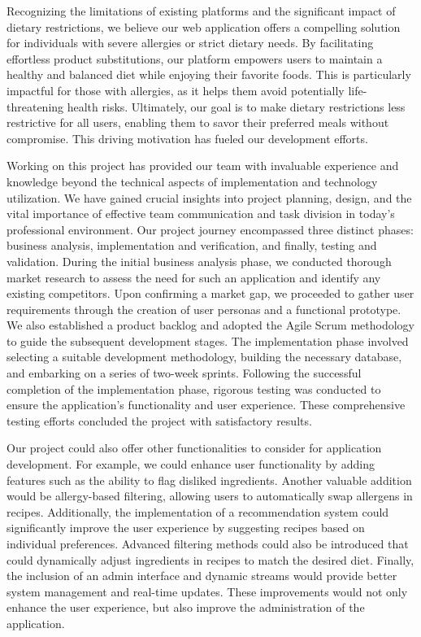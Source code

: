 Recognizing the limitations of existing platforms and the significant impact of dietary restrictions, we believe our web application offers a compelling solution for individuals with severe allergies or strict dietary needs. By facilitating effortless product substitutions, our platform empowers users to maintain a healthy and balanced diet while enjoying their favorite foods. This is particularly impactful for those with allergies, as it helps them avoid potentially life-threatening health risks. Ultimately, our goal is to make dietary restrictions less restrictive for all users, enabling them to savor their preferred meals without compromise. This driving motivation has fueled our development efforts.
{\par}
Working on this project has provided our team with invaluable experience and knowledge beyond the technical aspects of implementation and technology utilization. We have gained crucial insights into project planning, design, and the vital importance of effective team communication and task division in today's professional environment. Our project journey encompassed three distinct phases: business analysis, implementation and verification, and finally, testing and validation. During the initial business analysis phase, we conducted thorough market research to assess the need for such an application and identify any existing competitors. Upon confirming a market gap, we proceeded to gather user requirements through the creation of user personas and a functional prototype. We also established a product backlog and adopted the Agile Scrum methodology to guide the subsequent development stages. The implementation phase involved selecting a suitable development methodology, building the necessary database, and embarking on a series of two-week sprints. Following the successful completion of the implementation phase, rigorous testing was conducted to ensure the application's functionality and user experience. These comprehensive testing efforts concluded the project with satisfactory results.
{\par}
Our project could also offer other functionalities to consider for application development. For example, we could enhance user functionality by adding features such as the ability to flag disliked ingredients. Another valuable addition would be allergy-based filtering, allowing users to automatically swap allergens in recipes. Additionally, the implementation of a recommendation system could significantly improve the user experience by suggesting recipes based on individual preferences. Advanced filtering methods could also be introduced that could dynamically adjust ingredients in recipes to match the desired diet. Finally, the inclusion of an admin interface and dynamic streams would provide better system management and real-time updates. These improvements would not only enhance the user experience, but also improve the administration of the application.
    
